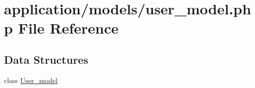 \hypertarget{user__model_8php}{\section{application/models/user\-\_\-model.php File Reference}
\label{user__model_8php}
}
\subsection*{Data Structures}
\begin{DoxyCompactItemize}
\item 
class \hyperlink{class_user__model}{User\-\_\-model}
\end{DoxyCompactItemize}
